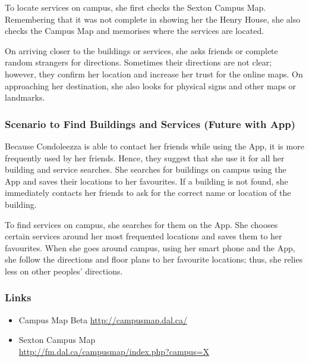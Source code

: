 \documentclass{article}
\begin{document}
To locate services on campus, she first checks the Sexton Campus Map.
Remembering that it was not complete in showing her the Henry House, she also
checks the Campus Map and memorises where the services are located.

On arriving closer to the buildings or services, she asks friends or complete
random strangers for directions. Sometimes their directions are not clear;
however, they confirm her location and increase her trust for the online maps.
On approaching her destination, she also looks for physical signs and other maps
or landmarks.

\subsubsection{Scenario to Find Buildings and Services (Future with App)}

Because Condoleezza is able to contact her friends while using the App, it is
more frequently used by her friends. Hence, they suggest that she use it for all
her building and service searches. She searches for buildings on campus using
the App and saves their locations to her favourites. If a building is not found,
she immediately contacts her friends to ask for the correct name or location of
the building. 

To find services on campus, she searches for them on the App. She chooses
certain services around her most frequented locations and saves them to her
favourites. When she goes around campus, using her smart phone and the App, she
follow the directions and floor plans to her favourite locations; thus, she
relies less on other peoples’ directions.

\subsubsection{Links}
\begin{itemize}
\item Campus Map Beta \hfill                      \url{http://campusmap.dal.ca/}
\item Sexton Campus Map \\
                      \hfill \url{http://fm.dal.ca/campusmap/index.php?campus=X}
\end{itemize}
\end{document}
